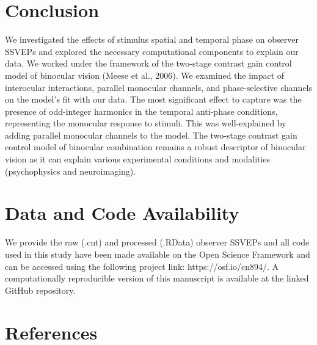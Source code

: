 \documentclass[
  12pt,
]{article}
\begin{document}
\section{Conclusion}\label{conclusion}

We investigated the effects of stimulus spatial and temporal phase on
observer SSVEPs and explored the necessary computational components to
explain our data. We worked under the framework of the two-stage
contrast gain control model of binocular vision (Meese et al., 2006). We
examined the impact of interocular interactions, parallel monocular
channels, and phase-selective channels on the model's fit with our data.
The most significant effect to capture was the presence of odd-integer
harmonics in the temporal anti-phase conditions, representing the
monocular response to stimuli. This was well-explained by adding
parallel monocular channels to the model. The two-stage contrast gain
control model of binocular combination remains a robust descriptor of
binocular vision as it can explain various experimental conditions and
modalities (psychophysics and neuroimaging).

\section{Data and Code Availability}\label{data-and-code-availability}

We provide the raw (.cnt) and processed (.RData) observer SSVEPs and all
code used in this study have been made available on the Open Science
Framework and can be accessed using the following project link:
https://osf.io/cn894/. A computationally reproducible version of this
manuscript is available at the linked GitHub repository.

\section*{References}\label{references}
\end{document}
